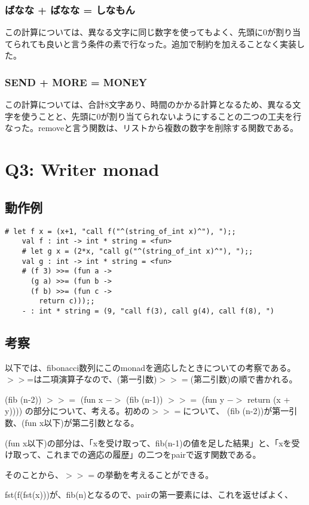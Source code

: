 \documentclass[uplatex,12pt]{jsarticle}
\begin{document}
\subsubsection{ばなな + ばなな = しなもん}
この計算については、異なる文字に同じ数字を使ってもよく、先頭に0が割り当てられても良いと言う条件の素で行なった。追加で制約を加えることなく実装した。
\subsubsection{SEND + MORE = MONEY}
この計算については、合計8文字あり、時間のかかる計算となるため、異なる文字を使うことと、先頭に0が割り当てられないようにすることの二つの工夫を行なった。removeと言う関数は、リストから複数の数字を削除する関数である。


\section{Q3: Writer monad}
\subsection{動作例}
  \begin{lstlisting}[caption=動作例]
    # let f x = (x+1, "call f("^(string_of_int x)^"), ");;
    val f : int -> int * string = <fun>
    # let g x = (2*x, "call g("^(string_of_int x)^"), ");;
    val g : int -> int * string = <fun>
    # (f 3) >>= (fun a ->
      (g a) >>= (fun b ->
      (f b) >>= (fun c ->
        return c)));;
    - : int * string = (9, "call f(3), call g(4), call f(8), ")
  \end{lstlisting}

\subsection{考察}
以下では、fibonacci数列にこのmonadを適応したときについての考察である。
$>>$=は二項演算子なので、(第一引数)$>>=$(第二引数)の順で書かれる。

(fib (n-2)) $>>=$ (fun x $->$
    (fib (n-1)) $>>=$ (fun y $->$
    return (x + y))))
の部分について、考える。初めの$>>=$について、
(fib (n-2))が第一引数、(fun x以下)が第二引数となる。

(fun x以下)の部分は、「xを受け取って、fib(n-1)の値を足した結果」と、「xを受け取って、これまでの適応の履歴」の二つをpairで返す関数である。

そのことから、$>>=$の挙動を考えることができる。

fst(f(fst(x)))が、fib(n)となるので、pairの第一要素には、これを返せばよく、
\end{document}
